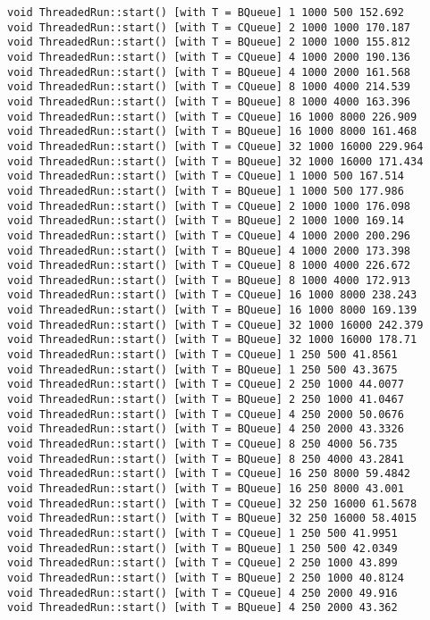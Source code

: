 \begin{verbatim}
void ThreadedRun::start() [with T = BQueue] 1 1000 500 152.692
void ThreadedRun::start() [with T = CQueue] 2 1000 1000 170.187
void ThreadedRun::start() [with T = BQueue] 2 1000 1000 155.812
void ThreadedRun::start() [with T = CQueue] 4 1000 2000 190.136
void ThreadedRun::start() [with T = BQueue] 4 1000 2000 161.568
void ThreadedRun::start() [with T = CQueue] 8 1000 4000 214.539
void ThreadedRun::start() [with T = BQueue] 8 1000 4000 163.396
void ThreadedRun::start() [with T = CQueue] 16 1000 8000 226.909
void ThreadedRun::start() [with T = BQueue] 16 1000 8000 161.468
void ThreadedRun::start() [with T = CQueue] 32 1000 16000 229.964
void ThreadedRun::start() [with T = BQueue] 32 1000 16000 171.434
void ThreadedRun::start() [with T = CQueue] 1 1000 500 167.514
void ThreadedRun::start() [with T = BQueue] 1 1000 500 177.986
void ThreadedRun::start() [with T = CQueue] 2 1000 1000 176.098
void ThreadedRun::start() [with T = BQueue] 2 1000 1000 169.14
void ThreadedRun::start() [with T = CQueue] 4 1000 2000 200.296
void ThreadedRun::start() [with T = BQueue] 4 1000 2000 173.398
void ThreadedRun::start() [with T = CQueue] 8 1000 4000 226.672
void ThreadedRun::start() [with T = BQueue] 8 1000 4000 172.913
void ThreadedRun::start() [with T = CQueue] 16 1000 8000 238.243
void ThreadedRun::start() [with T = BQueue] 16 1000 8000 169.139
void ThreadedRun::start() [with T = CQueue] 32 1000 16000 242.379
void ThreadedRun::start() [with T = BQueue] 32 1000 16000 178.71
void ThreadedRun::start() [with T = CQueue] 1 250 500 41.8561
void ThreadedRun::start() [with T = BQueue] 1 250 500 43.3675
void ThreadedRun::start() [with T = CQueue] 2 250 1000 44.0077
void ThreadedRun::start() [with T = BQueue] 2 250 1000 41.0467
void ThreadedRun::start() [with T = CQueue] 4 250 2000 50.0676
void ThreadedRun::start() [with T = BQueue] 4 250 2000 43.3326
void ThreadedRun::start() [with T = CQueue] 8 250 4000 56.735
void ThreadedRun::start() [with T = BQueue] 8 250 4000 43.2841
void ThreadedRun::start() [with T = CQueue] 16 250 8000 59.4842
void ThreadedRun::start() [with T = BQueue] 16 250 8000 43.001
void ThreadedRun::start() [with T = CQueue] 32 250 16000 61.5678
void ThreadedRun::start() [with T = BQueue] 32 250 16000 58.4015
void ThreadedRun::start() [with T = CQueue] 1 250 500 41.9951
void ThreadedRun::start() [with T = BQueue] 1 250 500 42.0349
void ThreadedRun::start() [with T = CQueue] 2 250 1000 43.899
void ThreadedRun::start() [with T = BQueue] 2 250 1000 40.8124
void ThreadedRun::start() [with T = CQueue] 4 250 2000 49.916
void ThreadedRun::start() [with T = BQueue] 4 250 2000 43.362

\end{verbatim}
